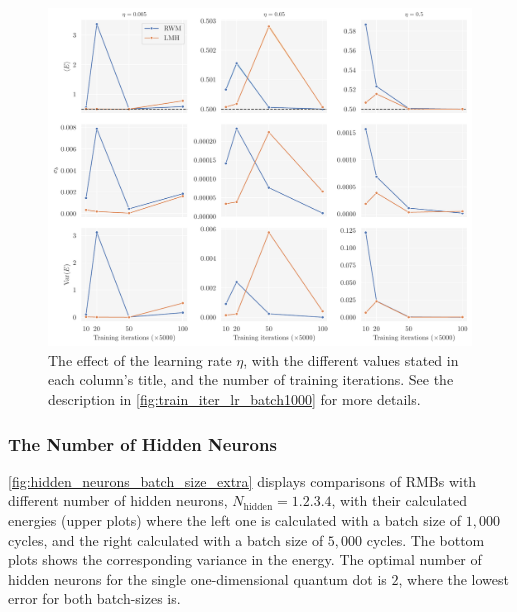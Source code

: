 \begin{figure}[!htb]
\begin{center}\includegraphics[width=\textwidth]{latex/figures/training_cycles_lr.pdf}
\end{center}
\caption{The effect of the learning rate $\eta$, with the different values stated in each column's title, and the number of training iterations. See the description in \autoref{fig:train_iter_lr_batch1000} for more details.}
\label{fig:train_iter_lr_batch5000}
\end{figure}

\FloatBarrier

\subsubsection*{The Number of Hidden Neurons}


\autoref{fig:hidden_neurons_batch_size_extra} displays comparisons of RMBs with different number of hidden neurons, $N_{\mathrm{hidden}}= \qty{1, 2, 3, 4}$, with their calculated energies (upper plots) where the left one is calculated with a batch size of $1,000$ cycles, and the right calculated with a batch size of $5,000$ cycles. The bottom plots shows the corresponding variance in the energy. The optimal number of hidden neurons for the single one-dimensional quantum dot is $2$, where the lowest error for both batch-sizes is. 

